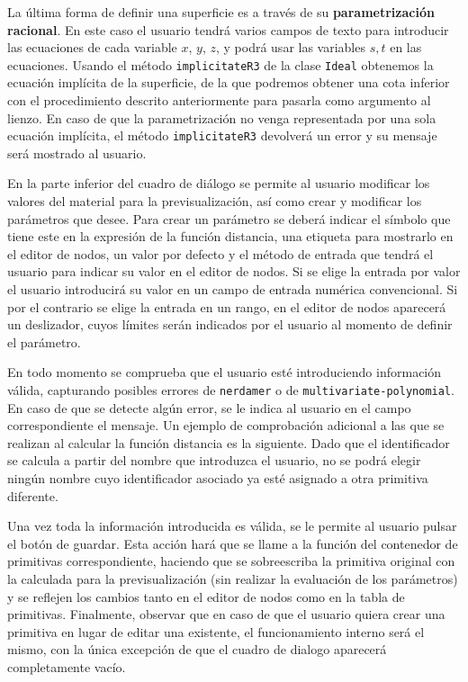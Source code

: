 La última forma de definir una superficie es a través de su \textbf{parametrización racional}. En este caso el usuario tendrá varios campos de texto para introducir las ecuaciones de cada variable $x$, $y$, $z$, y podrá usar las variables $s,t$ en las ecuaciones. Usando el método \texttt{implicitateR3} de la clase \texttt{Ideal} 
obtenemos la ecuación implícita de la superficie, de la que podremos obtener una cota inferior con el procedimiento descrito anteriormente para pasarla como argumento al lienzo. En caso de que la parametrización no venga representada por una sola ecuación implícita, el método \texttt{implicitateR3} devolverá un error y su mensaje será mostrado al usuario.\newline

En la parte inferior del cuadro de diálogo se permite al usuario modificar los valores del material para la previsualización, así como crear y modificar los parámetros que desee. Para crear un parámetro se deberá indicar el símbolo que tiene este en la expresión de la función distancia, una etiqueta para mostrarlo en el editor de nodos, un valor por defecto y el método de entrada que tendrá el usuario para indicar  su valor en el editor de nodos. Si se elige la entrada por valor el usuario introducirá su valor en un campo de entrada numérica convencional. Si por el contrario se elige la entrada en un rango, en el editor de nodos aparecerá un deslizador, cuyos límites serán indicados por el usuario al momento de definir el parámetro.\newline

En todo momento se comprueba que el usuario esté introduciendo información válida, capturando posibles errores de \texttt{nerdamer} o de \texttt{multivariate-polynomial}. En caso de que se detecte algún error, se le indica al usuario en el campo correspondiente el mensaje. Un ejemplo de comprobación adicional a las que se realizan al calcular la función distancia es la siguiente. Dado que el identificador se calcula a partir del nombre que introduzca el usuario, no se podrá elegir ningún nombre cuyo identificador asociado ya esté asignado a otra primitiva diferente.\newline

Una vez toda la información introducida es válida, se le permite al usuario pulsar el botón de guardar. Esta acción hará que se llame a la función del contenedor de primitivas correspondiente, haciendo que se sobreescriba la primitiva original con la calculada para la previsualización (sin realizar la evaluación de los parámetros) y se reflejen los cambios tanto en el editor de nodos como en la tabla de primitivas. Finalmente, observar que en caso de que el usuario quiera crear una primitiva en lugar de editar una existente, el funcionamiento interno será el mismo, con la única excepción de que el cuadro de dialogo aparecerá completamente vacío.

